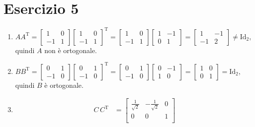 \documentclass{article}
\begin{document}
\section*{Esercizio 5}
\begin{enumerate}
    \item $AA^\text{T}=
        \begin{bmatrix} 1 & 0 \\ -1 & 1 \end{bmatrix}
        \begin{bmatrix} 1 & 0 \\ -1 & 1 \end{bmatrix}^\text{T} =
        \begin{bmatrix} 1 & 0 \\ -1 & 1 \end{bmatrix}
        \begin{bmatrix} 1 & -1 \\ 0 & 1 \end{bmatrix} =
        \begin{bmatrix} 1 & -1 \\ -1 & 2 \end{bmatrix} \ne \text{Id}_2
    $, quindi $A$ non è ortogonale.
    \item $BB^\text{T}=
        \begin{bmatrix} 0 & 1 \\ -1 & 0 \end{bmatrix}
        \begin{bmatrix} 0 & 1 \\ -1 & 0 \end{bmatrix}^\text{T} =
        \begin{bmatrix} 0 & 1 \\ -1 & 0 \end{bmatrix}
        \begin{bmatrix} 0 & -1 \\ 1 & 0 \end{bmatrix} =
        \begin{bmatrix} 1 & 0 \\ 0 & 1 \end{bmatrix} = \text{Id}_2
    $, quindi $B$ è ortogonale.
    \item \begin{equation*}\begin{aligned}
        C\,C^\text{T} &=
        \begin{bmatrix}
            \frac{1}{\sqrt{2}} & -\frac{1}{\sqrt{2}} & 0 \\
            0 & 0 & 1 \\

\end{bmatrix}
\end{aligned}
\end{equation*}
\end{enumerate}
\end{document}
